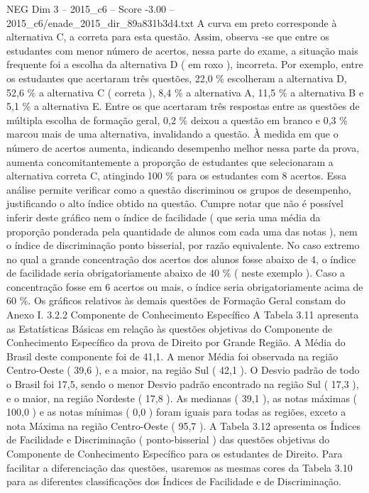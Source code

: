 \begin{textsample}{NEG Dim 3 – 2015\_c6 – Score -3.00 – 2015\_c6/enade\_2015\_dir\_89a831b3d4.txt}
A curva em preto corresponde à alternativa C, a correta para esta questão.
Assim, observa -se que entre os estudantes com menor número de acertos, nessa parte do exame, a situação mais frequente foi a escolha da alternativa D ( em roxo ), incorreta.
Por exemplo, entre os estudantes que acertaram três questões, 22,0 \% escolheram a alternativa D, 52,6 \% a alternativa C ( correta ), 8,4 \% a alternativa A, 11,5 \% a alternativa B e 5,1 \% a alternativa E.
Entre os que acertaram três respostas entre as questões de múltipla escolha de formação geral, 0,2 \% deixou a questão em branco e 0,3 \% marcou mais de uma alternativa, invalidando a questão.
À medida em que o número de acertos aumenta, indicando desempenho melhor nessa parte da prova, aumenta concomitantemente a proporção de estudantes que selecionaram a alternativa correta C, atingindo 100 \% para os estudantes com 8 acertos.
Essa análise permite verificar como a questão discriminou os grupos de desempenho, justificando o alto índice obtido na questão.
Cumpre notar que não é possível inferir deste gráfico nem o índice de facilidade ( que seria uma média da proporção ponderada pela quantidade de alunos com cada uma das notas ), nem o índice de discriminação ponto bisserial, por razão equivalente.
No caso extremo no qual a grande concentração dos acertos dos alunos fosse abaixo de 4, o índice de facilidade seria obrigatoriamente abaixo de 40 \% ( neste exemplo ).
Caso a concentração fosse em 6 acertos ou mais, o índice seria obrigatoriamente acima de 60 \%.
Os gráficos relativos às demais questões de Formação Geral constam do Anexo I. 3.2.2 Componente de Conhecimento Específico A Tabela 3.11 apresenta as Estatísticas Básicas em relação às questões objetivas do Componente de Conhecimento Específico da prova de Direito por Grande Região.
A Média do Brasil deste componente foi de 41,1.
A menor Média foi observada na região Centro-Oeste ( 39,6 ), e a maior, na região Sul ( 42,1 ).
O Desvio padrão de todo o Brasil foi 17,5, sendo o menor Desvio padrão encontrado na região Sul ( 17,3 ), e o maior, na região Nordeste ( 17,8 ).
As medianas ( 39,1 ), as notas máximas ( 100,0 ) e as notas mínimas ( 0,0 ) foram iguais para todas as regiões, exceto a nota Máxima na região Centro-Oeste ( 95,7 ).
A Tabela 3.12 apresenta os Índices de Facilidade e Discriminação ( ponto-bisserial ) das questões objetivas do Componente de Conhecimento Específico para os estudantes de Direito.
Para facilitar a diferenciação das questões, usaremos as mesmas cores da Tabela 3.10 para as diferentes classificações dos Índices de Facilidade e de Discriminação.

\end{textsample}
